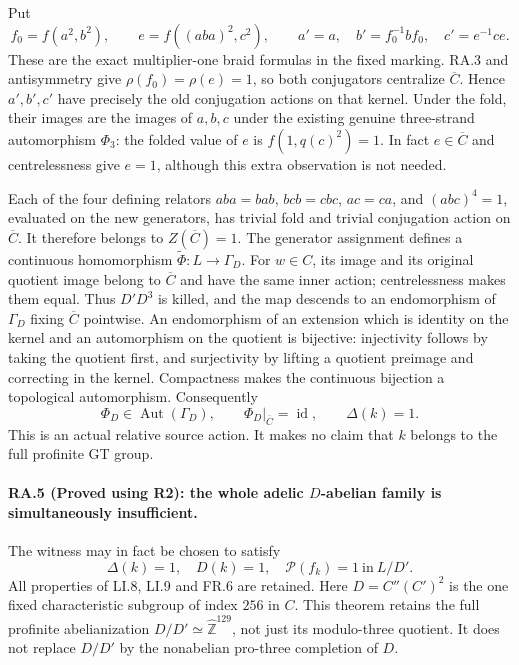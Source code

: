 Put
\[
 f_0=f(a^2,b^2),\qquad e=f((aba)^2,c^2),
 \qquad
 a'=a,\quad b'=f_0^{-1}bf_0,\quad c'=e^{-1}ce.
\]
These are the exact multiplier-one braid formulas in the
fixed marking.  RA.3 and antisymmetry give
$\rho(f_0)=\rho(e)=1$, so both conjugators centralize
$\overline C$.  Hence $a',b',c'$ have precisely the old
conjugation actions on that kernel.  Under the fold, their
images are the images of $a,b,c$ under the existing genuine
three-strand automorphism $\Phi_3$: the folded value of $e$
is $f(1,q(c)^2)=1$.  In fact $e\in\overline C$ and
centrelessness give $e=1$, although this extra observation
is not needed.

Each of the four defining relators
$aba=bab$, $bcb=cbc$, $ac=ca$, and $(abc)^4=1$,
evaluated on the new generators, has trivial fold and
trivial conjugation action on $\overline C$.  It therefore
belongs to $Z(\overline C)=1$.  The generator assignment
defines a continuous homomorphism
$\widetilde\Phi:L\to\Gamma_D$.
For $w\in C$, its image and its original quotient image
belong to $\overline C$ and have the same inner action;
centrelessness makes them equal.  Thus $D'D^3$ is killed,
and the map descends to an endomorphism of $\Gamma_D$
fixing $\overline C$ pointwise.  An endomorphism of an
extension which is identity on the kernel and an
automorphism on the quotient is bijective: injectivity
follows by taking the quotient first, and surjectivity by
lifting a quotient preimage and correcting in the kernel.
Compactness makes the continuous bijection a topological
automorphism.  Consequently
\[
 \boxed{\quad \Phi_D\in\operatorname{Aut}(\Gamma_D),
   \qquad \Phi_D|_{\overline C}=\operatorname{id},
   \qquad\Delta(k)=1.\quad}
\]
This is an actual relative source action.  It makes no
claim that $k$ belongs to the full profinite GT group.

\paragraph{RA.5 (Proved using R2): the whole adelic
$D$-abelian family is simultaneously insufficient.}
The witness may in fact be chosen to satisfy
\[
 \boxed{\quad \Delta(k)=1,\quad D(k)=1,\quad
       \mathcal P(f_k)=1\ \text{in}\ L/D'.\quad}
\]
All properties of LI.8, LI.9 and FR.6 are retained.
Here $D=C''(C')^2$ is the one fixed characteristic
subgroup of index $256$ in $C$.  This theorem retains
the full profinite abelianization
$D/D'\simeq\widehat{\mathbb Z}^{129}$, not just its
modulo-three quotient.  It does not replace $D/D'$ by
the nonabelian pro-three completion of $D$.


